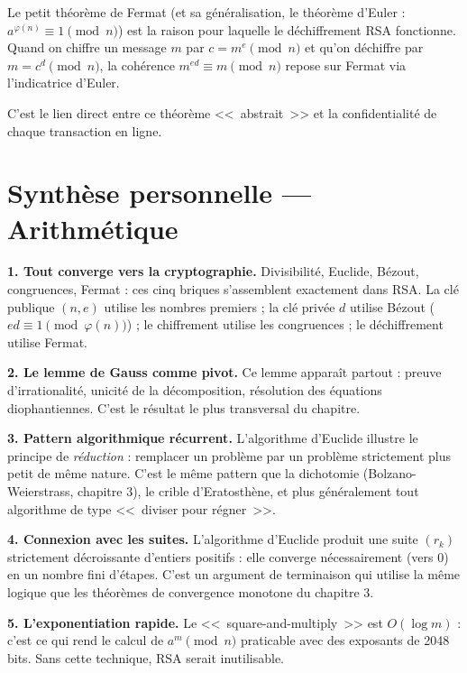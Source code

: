 \begin{intuitionbox}
Le petit théorème de Fermat (et sa généralisation, le théorème d'Euler : $a^{\varphi(n)} \equiv 1 \pmod{n}$) est la raison pour laquelle le déchiffrement RSA fonctionne. Quand on chiffre un message $m$ par $c = m^e \pmod{n}$ et qu'on déchiffre par $m = c^d \pmod{n}$, la cohérence $m^{ed} \equiv m \pmod{n}$ repose sur Fermat via l'indicatrice d'Euler.

C'est le lien direct entre ce théorème <<~abstrait~>> et la confidentialité de chaque transaction en ligne.
\end{intuitionbox}


\section{Synthèse personnelle --- Arithmétique}

\begin{intuitionbox}
\textbf{1. Tout converge vers la cryptographie.} Divisibilité, Euclide, Bézout, congruences, Fermat : ces cinq briques s'assemblent exactement dans RSA. La clé publique $(n, e)$ utilise les nombres premiers ; la clé privée $d$ utilise Bézout ($ed \equiv 1 \pmod{\varphi(n)}$) ; le chiffrement utilise les congruences ; le déchiffrement utilise Fermat.

\textbf{2. Le lemme de Gauss comme pivot.} Ce lemme apparaît partout : preuve d'irrationalité, unicité de la décomposition, résolution des équations diophantiennes. C'est le résultat le plus transversal du chapitre.

\textbf{3. Pattern algorithmique récurrent.} L'algorithme d'Euclide illustre le principe de \emph{réduction} : remplacer un problème par un problème strictement plus petit de même nature. C'est le même pattern que la dichotomie (Bolzano-Weierstrass, chapitre 3), le crible d'Eratosthène, et plus généralement tout algorithme de type <<~diviser pour régner~>>.

\textbf{4. Connexion avec les suites.} L'algorithme d'Euclide produit une suite $(r_k)$ strictement décroissante d'entiers positifs : elle converge nécessairement (vers 0) en un nombre fini d'étapes. C'est un argument de terminaison qui utilise la même logique que les théorèmes de convergence monotone du chapitre 3.

\textbf{5. L'exponentiation rapide.} Le <<~square-and-multiply~>> est $O(\log m)$ : c'est ce qui rend le calcul de $a^m \pmod{n}$ praticable avec des exposants de 2048 bits. Sans cette technique, RSA serait inutilisable.
\end{intuitionbox}


